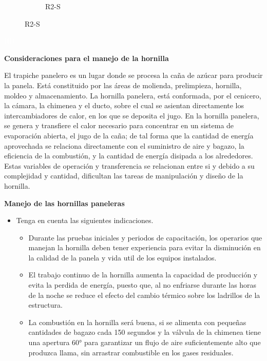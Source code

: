 \documentclass{article}%
\begin{document}
\begin{figure}[h!]
\begin{subfigure}{0.33\linewidth}
\caption{R2{-}S}%
\end{subfigure}%
\linebreak%
\newpage%
\end{figure}

%
\newpage%
\textcolor{white}{ 
HH
}%
\begin{large}%
\begin{Large}%
\textbf{Consideraciones para el manejo de la hornilla}%
\end{Large}%
\newline%
 \newline%
El trapiche panelero es un lugar donde se procesa la caña de azúcar para producir la panela. Está constituido por las áreas de molienda, prelimpieza, hornilla, moldeo y almacenamiento.%
\newline%
 La hornilla panelera, está conformada, por el cenicero, la cámara, la chimenea y el ducto, sobre el cual se asientan directamente los intercambiadores de calor, en los que se deposita el jugo. En la hornilla panelera, se genera y transfiere el calor necesario para concentrar en un sistema de evaporación abierta, el jugo de la caña; de tal forma que la cantidad de energía aprovechada se relaciona directamente con el suministro de aire y bagazo, la eficiencia de la combustión, y la cantidad de energía disipada a los alrededores. Estas variables de operación y transferencia se relacionan entre si y debido a su complejidad y cantidad, dificultan las tareas de manipulación y diseño de la hornilla.%
\begin{Large}%
\textbf{\newline%
 \newline%
 Manejo de las hornillas paneleras}%
\end{Large}%
\begin{itemize}%
\item%
Tenga en cuenta las siguientes indicaciones.%
\begin{itemize}%
\item%
Durante las pruebas iniciales y periodos de capacitación, los operarios que manejan la hornilla deben tener experiencia para evitar la disminución en la calidad de la panela y vida util de los equipos instalados.%
\item%
El trabajo continuo de la hornilla aumenta la capacidad de producción y evita la perdida de energía, puesto que, al no enfriarse durante las horas de la noche se reduce el efecto del cambio térmico sobre los ladrillos de la estructura.%
\item%
La combustión en la hornilla será buena, si se alimenta con pequeñas cantidades de bagazo cada 150 segundos y la válvula de la chimenea tiene una apertura 60° para garantizar un flujo de aire suficientemente alto que produzca llama, sin arrastrar combustible en los gases residuales.%

\end{itemize}
\end{itemize}
\end{large}
\end{document}
